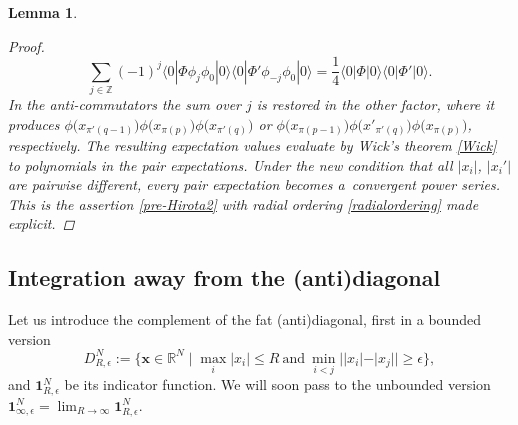 \documentclass[pdftex]{sigma}
\numberwithin{equation}{section}
\newtheorem{Lemma}[Theorem]{Lemma}
\begin{document}
\begin{Lemma}
\begin{proof}
\[
\sum_{j\in \mathbb{Z}} (-1)^j\langle 0|\Phi \phi_j\phi_0|0\rangle
\langle 0|\Phi' \phi_{-j}\phi_0|0\rangle =\frac{1}{4}
\langle 0|\Phi|0\rangle\langle 0|\Phi'|0\rangle.
\]
In the anti-commutators the sum over $j$ is restored in the other factor,
where it produces
$\phi\bigl(x_{\pi'(q-1)}\bigr) \phi\bigl(x_{\pi(p)}\bigr)\phi\bigl(x_{\pi'(q)}\bigr)$
or $\phi\bigl(x_{\pi(p-1)}\bigr) \phi\bigl(x'_{\pi'(q)}\bigr)\phi\bigl(x_{\pi(p)}\bigr)$, respectively.
The resulting expectation values evaluate by
Wick's theorem \eqref{Wick} to polynomials in the pair
expectations. Under the new condition
that all $|x_i|$, $|x_i'|$ are pairwise different, every
pair expectation becomes a~convergent power series.
This is the assertion \eqref{pre-Hirota2}
with radial ordering \eqref{radialordering} made
explicit.
\end{proof}
\end{Lemma}

\subsection{Integration away from the (anti)diagonal}

Let us introduce the complement of the fat (anti)diagonal, first in a bounded version
\[
D^N_{R,\epsilon}:=\bigl\{\boldsymbol{x} \in \mathbb{R}^{N} \mid
\max_i |x_i| \leq R \ \text{and} \ \min_{i < j} ||x_i|-|x_j||\geq \epsilon\bigr\},
\]
and $\mathbf{1}^{N}_{R,\epsilon}$ be its indicator function. We will soon pass to the unbounded version $\mathbf{1}^N_{\infty,\epsilon}
=\lim_{R\to \infty} \mathbf{1}^N_{R,\epsilon}$.
\end{document}
